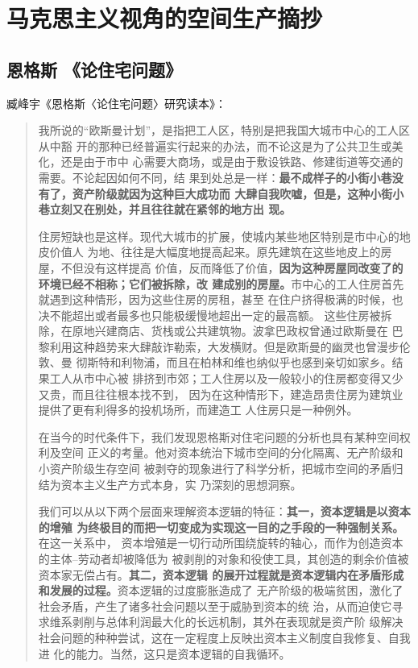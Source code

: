 \chapter{马克思主义视角的空间生产摘抄}

\section{恩格斯 《论住宅问题》}

臧峰宇《恩格斯〈论住宅问题〉研究读本》：
\begin{quotation}
  我所说的“欧斯曼计划”，是指把工人区，特别是把我国大城市中心的工人区从中豁
  开的那种已经普遍实行起来的办法，而不论这是为了公共卫生或美化，还是由于市中
  心需要大商场，或是由于敷设铁路、修建街道等交通的需要。不论起因如何不同，结
  果到处总是一样：\textbf{最不成样子的小街小巷没有了，资产阶级就因为这种巨大成功而
    大肆自我吹嘘，但是，这种小街小巷立刻又在别处，并且往往就在紧邻的地方出
    现。}

  住房短缺也是这样。现代大城市的扩展，使城内某些地区特别是市中心的地皮价值人
  为地、往往是大幅度地提高起来。原先建筑在这些地皮上的房屋，不但没有这样提高
  价值，反而降低了价值，\textbf{因为这种房屋同改变了的环境已经不相称；它们被拆除，改
  建成别的房屋。}市中心的工人住房首先就遇到这种情形，因为这些住房的房租，甚至
  在住户挤得极满的时候，也决不能超出或者最多也只能极缓慢地超出一定的最高额。
  这些住房被拆除，在原地兴建商店、货栈或公共建筑物。波拿巴政权曾通过欧斯曼在
  巴黎利用这种趋势来大肆敲诈勒索，大发横财。但是欧斯曼的幽灵也曾漫步伦敦、曼
  彻斯特和利物浦，而且在柏林和维也纳似乎也感到亲切如家乡。结果工人从市中心被
  排挤到市郊；工人住房以及一般较小的住房都变得又少又贵，而且往往根本找不到，
  因为在这种情形下，建造昂贵住房为建筑业提供了更有利得多的投机场所，而建造工
  人住房只是一种例外。

  在当今的时代条件下，我们发现恩格斯对住宅问题的分析也具有某种空间权利及空间
  正义的考量。他对资本统治下城市空间的分化隔离、无产阶级和小资产阶级生存空间
  被剥夺的现象进行了科学分析，把城市空间的矛盾归结为资本主义生产方式本身，实
  乃深刻的思想洞察。

  我们可以从以下两个层面来理解资本逻辑的特征：\textbf{其一，资本逻辑是以资本的增殖
    为终极目的而把一切变成为实现这一目的之手段的一种强制关系。}在这一关系中，
  资本增殖是一切行动所围绕旋转的轴心，而作为创造资本的主体--劳动者却被降低为
  被剥削的对象和役使工具，其创造的剩余价值被资本家无偿占有。\textbf{其二，资本逻辑
    的展开过程就是资本逻辑内在矛盾形成和发展的过程。}资本逻辑的过度膨胀造成了
  无产阶级的极端贫困，激化了社会矛盾，产生了诸多社会问题以至于威胁到资本的统
  治，从而迫使它寻求维系剥削与总体利润最大化的长远机制，其外在表现就是资产阶
  级解决社会问题的种种尝试，这在一定程度上反映出资本主义制度自我修复、自我进
  化的能力。当然，这只是资本逻辑的自我循环。


\end{quotation}
